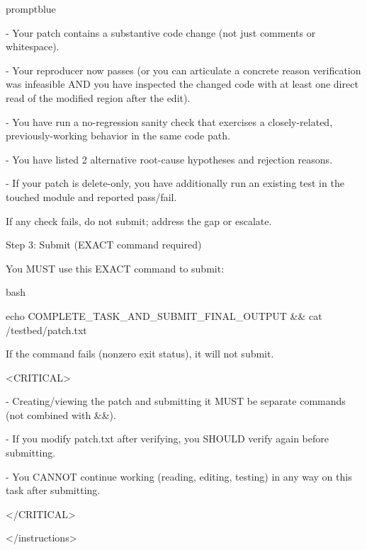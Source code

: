 \documentclass{llmxive}
\begin{document}
\begin{promptbox}{promptblue}
{- Your patch contains a substantive code change (not just comments or whitespace).\par
- Your reproducer now passes (or you can articulate a concrete reason verification was infeasible AND you have inspected the changed code with at least one direct read of the modified region after the edit).\par
- You have run a no-regression sanity check that exercises a closely-related, previously-working behavior in the same code path.\par
- You have listed 2 alternative root-cause hypotheses and rejection reasons.\par
- If your patch is delete-only, you have additionally run an existing test in the touched module and reported pass/fail.\par
\vspace{0.35em}\par
If any check fails, do not submit; address the gap or escalate.\par
\vspace{0.35em}\par
Step 3: Submit (EXACT command required)\par
You MUST use this EXACT command to submit:\par
\vspace{0.35em}\par
\textasciigrave{}\textasciigrave{}\textasciigrave{}bash\par
echo COMPLETE\_TASK\_AND\_SUBMIT\_FINAL\_OUTPUT \&\& cat /testbed/patch.txt\par
\textasciigrave{}\textasciigrave{}\textasciigrave{}\par
\vspace{0.35em}\par
If the command fails (nonzero exit status), it will not submit.\par
\vspace{0.35em}\par
\textless{}CRITICAL\textgreater{}\par
- Creating/viewing the patch and submitting it MUST be separate commands (not combined with \&\&).\par
- If you modify patch.txt after verifying, you SHOULD verify again before submitting.\par
- You CANNOT continue working (reading, editing, testing) in any way on this task after submitting.\par
\textless{}/CRITICAL\textgreater{}\par
\textless{}/instructions\textgreater{}\par
}
\end{promptbox}
\end{document}
